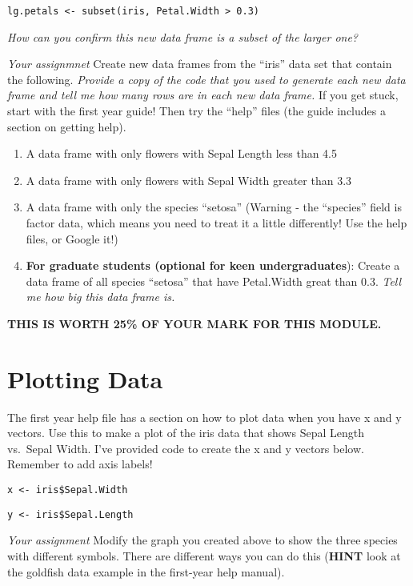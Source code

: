 \documentclass[]{book}
\begin{document}
\texttt{lg.petals\ \textless{}-\ subset(iris,\ Petal.Width\ \textgreater{}\ 0.3)}

\emph{How can you confirm this new data frame is a subset of the larger one?}

\emph{Your assignmnet} Create new data frames from the ``iris'' data set that contain the following. \emph{Provide a copy of the code that you used to generate each new data frame and tell me how many rows are in each new data frame.} If you get stuck, start with the first year guide! Then try the ``help'' files (the guide includes a section on getting help).

\begin{enumerate}
\def\labelenumi{\arabic{enumi}.}
\item
  A data frame with only flowers with Sepal Length less than 4.5
\item
  A data frame with only flowers with Sepal Width greater than 3.3
\item
  A data frame with only the species ``setosa'' (Warning - the ``species'' field is factor data, which means you need to treat it a little differently! Use the help files, or Google it!)
\item
  \textbf{For graduate students (optional for keen undergraduates}): Create a data frame of all species ``setosa'' that have Petal.Width great than 0.3. \emph{Tell me how big this data frame is.}
\end{enumerate}

\textbf{THIS IS WORTH 25\% OF YOUR MARK FOR THIS MODULE.}

\hypertarget{plotting-data}{%
\chapter{Plotting Data}\label{plotting-data}}

The first year help file has a section on how to plot data when you have x and y vectors. Use this to make a plot of the iris data that shows Sepal Length vs.~Sepal Width. I've provided code to create the x and y vectors below. Remember to add axis labels!

\texttt{x\ \textless{}-\ iris\$Sepal.Width}

\texttt{y\ \textless{}-\ iris\$Sepal.Length}

\emph{Your assignment} Modify the graph you created above to show the three species with different symbols. There are different ways you can do this (\textbf{HINT} look at the goldfish data example in the first-year help manual).
\end{document}
